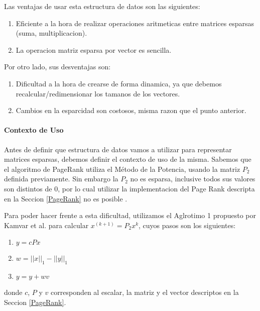 Las ventajas de usar esta estructura de datos son las siguientes:
\begin{enumerate}
  \item Eficiente a la hora de realizar operaciones aritmeticas entre matrices esparsas (suma, multiplicacion).
  \item La operacion matriz esparsa por vector es sencilla.
\end{enumerate}
Por otro lado, sus desventajas son:
\begin{enumerate}
  \item Dificultad a la hora de crearse de forma dinamica, ya que debemos recalcular/redimensionar los tamanos de los vectores.
  \item Cambios en la esparcidad son costosos, misma razon que el punto anterior.
\end{enumerate}

\paragraph{Contexto de Uso}

Antes de definir que estructura de datos vamos a utilizar para representar matrices esparsas, debemos definir el contexto de uso de la misma.
Sabemos que el algoritmo de PageRank utiliza el Método de la Potencia, usando la matriz $P_2$ definida previamente. Sin embargo la $P_2$ no es esparsa, inclusive todos sus valores son distintos de 0, por lo cual utilizar la implementacion del Page Rank descripta en la Seccion \ref{PageRank} no es posible .

Para poder hacer frente a esta dificultad, utilizamos el Aglrotimo 1 propuesto por Kamvar et al.\cite{Kamvar2003} para calcular $x^{(k+1)} = P_2x^{k}$, cuyos pasos son los siguientes:
\begin{enumerate}
    \item $y = cPx$
    \item $w = ||x||_1 - ||y||_1$
    \item $y = y + wv$
\end{enumerate}

donde $c$, $P$ y $v$ corresponden al escalar, la matriz y el vector descriptos en la Seccion \ref{PageRank}.


